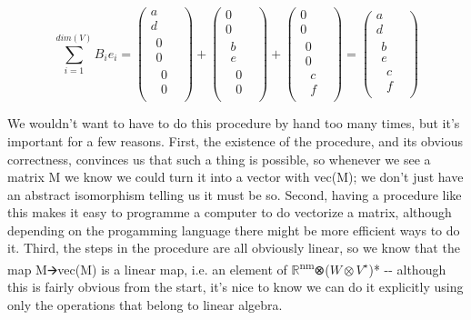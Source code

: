 \documentclass[oneside,english]{amsbook}
\numberwithin{section}{chapter}
\theoremstyle{plain}
\theoremstyle{definition}
\begin{document}
\[\sum_{i = 1}^{dim(V)}{B_{i}e_{i} = \begin{pmatrix}
		a \\
		d \\
		\begin{matrix}
			0 \\
			0 \\
			\begin{matrix}
				0 \\
				0
			\end{matrix}
		\end{matrix}
	\end{pmatrix} + \begin{pmatrix}
		0 \\
		0 \\
		\begin{matrix}
			b \\
			e \\
			\begin{matrix}
				0 \\
				0
			\end{matrix}
		\end{matrix}
	\end{pmatrix} + \begin{pmatrix}
		0 \\
		0 \\
		\begin{matrix}
			0 \\
			0 \\
			\begin{matrix}
				c \\
				f
			\end{matrix}
		\end{matrix}
	\end{pmatrix} = \begin{pmatrix}
		a \\
		d \\
		\begin{matrix}
			b \\
			e \\
			\begin{matrix}
				c \\
				f
			\end{matrix}
		\end{matrix}
\end{pmatrix}}\]

We wouldn't want to have to do this procedure by hand too many times,
but it's important for a few reasons. First, the existence of the
procedure, and its obvious correctness, convinces us that such a thing
is possible, so whenever we see a matrix M we know we could turn it into
a vector with vec(M); we don't just have an abstract isomorphism telling
us it must be so. Second, having a procedure like this makes it easy to
programme a computer to do vectorize a matrix, although depending on the
progamming language there might be more efficient ways to do it. Third,
the steps in the procedure are all obviously linear, so we know that the
map M🡪vec(M) is a linear map, i.e. an element of
$\mathbb{R}$\textsuperscript{nm}⊗($W\otimes V^\star$)* -\/- although this is fairly
obvious from the start, it's nice to know we can do it explicitly using
only the operations that belong to linear algebra.
\end{document}
